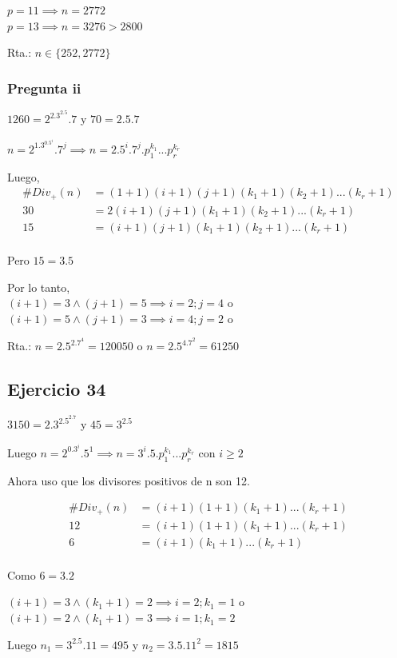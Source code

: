 $ p = 11 \implies n = 2772 $\\
$ p = 13 \implies n = 3276 > 2800 $

Rta.: $ n\in \{ 252, 2772 \} $

\subsubsection{Pregunta ii}
$ 1260 = 2^2.3^2.5.7 $ y $ 70 = 2.5.7 $

$ n = 2^1.3^0.5^i.7^j \implies n = 2.5^i.7^j.p_1^{k_1}...p_r^{k_r} $

Luego,
\begin{align*}
    \#Div_+(n) &= (1+1)(i+1)(j+1)(k_1+1)(k_2+1)...(k_r + 1) \\
    30 &= 2(i+1)(j+1)(k_1+1)(k_2+1)...(k_r + 1) \\
    15 &= (i+1)(j+1)(k_1+1)(k_2+1)...(k_r + 1) \\
\end{align*}

Pero $ 15 = 3.5 $

Por lo tanto, \\ 
$ (i+1) = 3 \wedge (j+1) = 5 \implies i = 2; j = 4 $ o \\
$ (i+1) = 5 \wedge (j+1) = 3 \implies i = 4; j = 2 $ o

Rta.: $ n = 2.5^2.7^4 = 120050 $ o $ n = 2.5^4.7^2 = 61250 $

\subsection{Ejercicio 34}
$ 3150 = 2.3^2.5^2.7 $ y $ 45=3^2.5 $

Luego $ n = 2^0.3^i.5^1 \implies n = 3^i.5.p_1^{k_1}...p_r^{k_r} $ con $ i\geq 2$

Ahora uso que los divisores positivos de n son 12.

\begin{align*}
    \#Div_+(n) &= (i+1)(1+1)(k_1+1)...(k_r+1) \\
    12 &= (i+1)(1+1)(k_1+1)...(k_r+1) \\
    6 &= (i+1)(k_1+1)...(k_r+1) \\
\end{align*}

Como $ 6 = 3.2 $

$ (i+1) = 3 \wedge (k_1 + 1) = 2 \implies i = 2; k_1 = 1$ o \\
$ (i+1) = 2 \wedge (k_1 + 1) = 3 \implies i = 1; k_1 = 2$

Luego $ n_1 = 3^2.5.11 = 495 $ y $ n_2 = 3.5.11^2 = 1815 $

